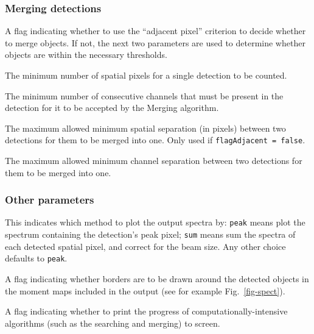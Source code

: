 \documentclass[12pt,a4paper]{article}
\newcommand{\entrylabel}[1]{\mbox{\textsf{\bf{#1:}}}\hfil}
\newenvironment{entry}
        {\begin{list}{}%
                {\renewcommand{\makelabel}{\entrylabel}%
                        \setlength{\labelwidth}{30mm}%
                        \setlength{\labelsep}{5pt}%
                        \setlength{\itemsep}{2pt}%
                        \setlength{\parsep}{2pt}%
                        \setlength{\leftmargin}{35mm}%
                }%
        }%
{\end{list}}
\begin{document}
\subsubsection*{Merging detections}
\begin{entry}
\item[flagAdjacent {\tt [true]}] A flag indicating whether to use the
  ``adjacent pixel'' criterion to decide whether to merge objects. If
  not, the next two parameters are used to determine whether objects
  are within the necessary thresholds.
\item[minPix {\tt [2]}] The minimum number of spatial pixels for a single
  detection to be counted.
\item[minChannels {\tt [3]}] The minimum number of consecutive
  channels that must be present in the detection for it to be accepted
  by the Merging algorithm.
\item[threshSpatial {\tt [3.]}] The maximum allowed minimum spatial
  separation (in pixels) between two detections for them to be merged
  into one. Only used if {\tt flagAdjacent = false}.
\item[threshVelocity {\tt [7.]}] The maximum allowed minimum channel
  separation between two detections for them to be merged into
  one. %
\end{entry}

\subsubsection*{Other parameters}
\begin{entry}
\item[spectralMethod {\tt [peak]}] This indicates which method to plot
  the output spectra by: {\tt peak} means plot the spectrum containing
  the detection's peak pixel; {\tt sum} means sum the spectra of each
  detected spatial pixel, and correct for the beam size. Any other
  choice defaults to {\tt peak}.
\item[drawBorders {\tt [true]}] A flag indicating whether borders
  are to be drawn around the detected objects in the moment maps
  included in the output (see for example Fig.~\ref{fig-spect}).
\item[verbose {\tt [true]}] A flag indicating whether to print the
  progress of computationally-intensive algorithms (such as the
  searching and merging) to screen.
\end{entry}
\end{document}
